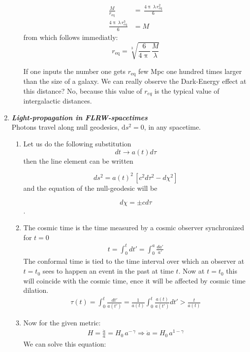 \documentclass[a4paper,12pt]{article}
\newcommand{\question}[1]{\textbf{\textit{#1}}}
\newcommand{\dd}{\mathrm{d}}
\renewcommand{\pi}{\uppi}
\begin{document}
\begin{enumerate}
\begin{enumerate}
		\begin{align}
		  \frac{M}{r_\textrm{eq}}&= \, \frac{4 \pi \, \lambda \, r_\textrm{eq}^2}{6}\\
		  \frac{4 \pi \, \lambda \, r_\textrm{eq}^3}{6}&=M
		\end{align}
		from which follows immediatly:
		\begin{equation}
		  r_\textrm{eq}=\sqrt[3]{\frac{6}{4 \pi} \, \frac{M}{\lambda}}
		\end{equation}
		 
		If one inputs the number one gets $ r_\textrm{eq} $ few  Mpc one hundred times larger than the size of a galaxy.
		We can really observe the Dark-Energy effect at this distance? No, because this value of $r_{eq}$ is the typical value of intergalactic distances.
        
        \end{enumerate}
		
		\item \question{Light-propagation in FLRW-spacetimes}\\
		Photons travel along null geodesics, $\dd s^2=0$, in any spacetime. 
		\begin{enumerate}
			\item Let us do the following substitution
			 \[dt \rightarrow a(t)d\tau\] 
			 then the line element can be written
                          
                          
                          \[ds^2=a(t)^2\, \left[ c^2d\tau^2-d\chi^2\right] \] 
                          and the equation of the null-geodesic will be
                          
                          \[d\chi=\pm cd\tau\].
			\item The cosmic time is the time measured by
                          a cosmic observer synchronized for $t=0$ 
 \begin{align}
   t=\int_0^t dt' = \int_0^a\frac{da'}{\dot{a}'}
   \end{align}
The conformal time is tied to the time interval over which an observer
at $t=t_0$ sees to happen an event in the past at time $t$. Now at
$t=t_0$ this will coincide with the cosmic time, ence it will be
affected by cosmic time dilation.
                          \begin{align}
                            \tau(t)=\int_0^t \frac{dt'}{a(t')} = \frac{1}{a(t)}
                              \int_0^t \frac{a(t)}{a(t')} dt' > \frac{t}{a(t)}
                          \end{align}
			\item Now for the given metric:
                          \begin{align}
                            H=\frac{\dot{a}}{a}= H_0 \, a^{-\,\gamma}
                            \Rightarrow \dot{a} = H_0 \, a^{1-\gamma}
                            \end{align}
				We can solve this equation:


\end{enumerate}
\end{enumerate}
\end{document}
